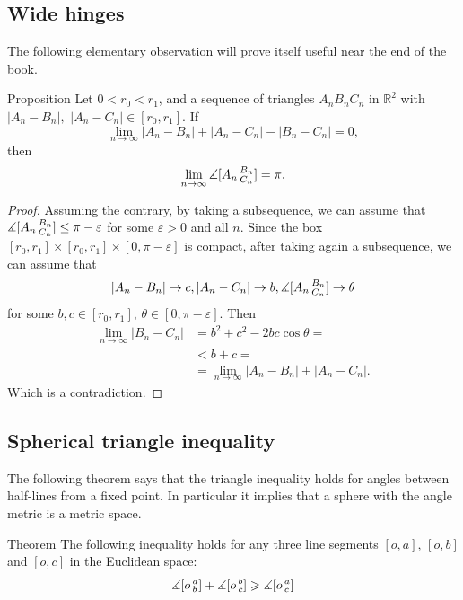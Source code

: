 
\subsection*{Wide hinges}

The following elementary observation will prove itself useful near the end of the book.

\begin{thm}{Proposition}\label{prop:wide-hinges}
Let $0<r_0< r_1 $, and a sequence of triangles $ A_nB_nC_n$ in $\mathbb{R}^2$ with $|A_n - B_n | , $ $| A_n - C_n |  \in [r_0,r_1]$. If 
\[   \lim_{n \to \infty}   |A_n - B_n | + | A_n - C_n |  - | B_n - C_n  |  =0 ,   \]
then 
\[  \lim_{n \to \infty}  \measuredangle[A_n \,{}^{B_n}_{C_n}] = \pi.     \]
\end{thm}

\begin{proof}
 Assuming the contrary, by taking a subsequence, we can assume that $\measuredangle[A_n \,{}^{B_n}_{C_n}] \leq \pi - \varepsilon$ for some $\varepsilon > 0$ and all $n$. Since the box $[r_0,r_1]\times [r_0 , r_1]\times [0, \pi - \varepsilon ]$ is compact, after taking again a subsequence, we can assume that 
 \[  | A_n - B_n  | \to c , |A_n - C_n | \to b ,  \measuredangle[A_n \,{}^{B_n}_{C_n}] \to \theta     \]
 for some $b,c \in [r_0, r_1]$, $\theta \in [0,\pi - \varepsilon ]$. Then
 \begin{align*}
\lim_{n \to \infty} | B_n - C_n  |
&= b^2 + c^2 - 2bc \cos \theta=
\\
&<  b+c=
\\
& =   \lim_{n \to \infty}   |A_n - B_n | + | A_n - C_n | .
\end{align*}
 Which is a contradiction.
\end{proof}


\subsection*{Spherical triangle inequality}

The following theorem says that the triangle inequality holds for angles between half-lines from a fixed point.
In particular it implies that a sphere with the angle metric is a metric space.

\begin{thm}{Theorem}\label{thm:spherical-triangle-inq}
The following inequality holds for any three line segments $[o,a]$, $[o,b]$ and $[o,c]$ in the Euclidean space:
\[\measuredangle[o\,{}^{a}_{b}]
+
\measuredangle[o\,{}^{b}_{c}]
\geqslant
\measuredangle[o\,{}^{a}_{c}]\]

\end{thm}

